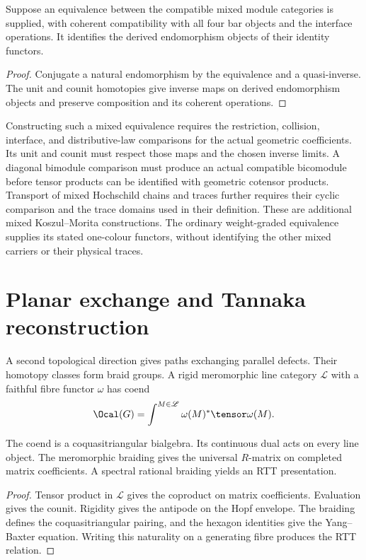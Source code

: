 \begin{proposition}
Suppose an equivalence between the compatible mixed module categories is supplied,
with coherent compatibility with all four bar objects and the interface operations.
It identifies the derived endomorphism objects of their identity functors.
\end{proposition}
\begin{proof}
Conjugate a natural endomorphism by the equivalence and a quasi-inverse.
The unit and counit homotopies give inverse maps on derived endomorphism objects
and preserve composition and its coherent operations.
\end{proof}

Constructing such a mixed equivalence requires the restriction, collision,
interface, and distributive-law comparisons for the actual geometric coefficients.
Its unit and counit must respect those maps and the chosen inverse limits.
A diagonal bimodule comparison must produce an actual compatible bicomodule
before tensor products can be identified with geometric cotensor products.
Transport of mixed Hochschild chains and traces further requires their
cyclic comparison and the trace domains used in their definition.
These are additional mixed Koszul--Morita constructions.
The ordinary weight-graded equivalence supplies its stated one-colour functors,
without identifying the other mixed carriers or their physical traces.

\chapter{Planar exchange and Tannaka reconstruction}
A second topological direction gives paths exchanging parallel defects.  Their homotopy classes form braid groups.  A rigid meromorphic line category $\mathscr L$ with a faithful fibre functor $\omega$ has coend
\[
 \Ocal(\mathbb G)=\int^{M\in\mathscr L}\omega(M)^*\tensor\omega(M).
\]

\begin{theorem}
The coend is a coquasitriangular bialgebra.  Its continuous dual acts on every line object.  The meromorphic braiding gives the universal $R$-matrix on completed matrix coefficients.  A spectral rational braiding yields an RTT presentation.
\end{theorem}
\begin{proof}
Tensor product in $\mathscr L$ gives the coproduct on matrix coefficients.  Evaluation gives the counit.  Rigidity gives the antipode on the Hopf envelope.  The braiding defines the coquasitriangular pairing, and the hexagon identities give the Yang--Baxter equation.  Writing this naturality on a generating fibre produces the RTT relation.
\end{proof}

